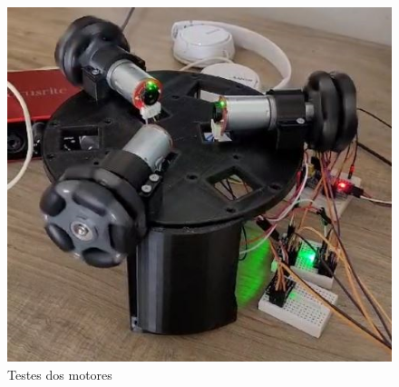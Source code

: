 \begin{figure}[h]
	\centering
	\includegraphics{figures/montagem_4}
	\caption{Testes dos motores}
	\label{fig:montagem_4}
\end{figure}
